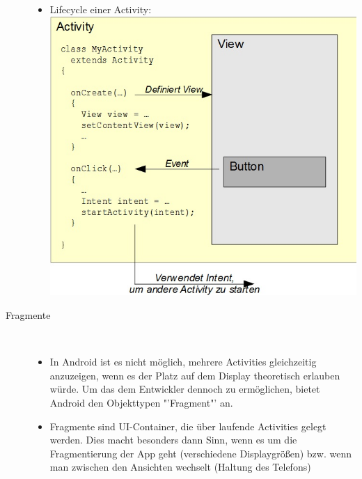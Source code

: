 \begin{description}
\begin{itemize}
\begin{itemize}
\end{itemize} 
\item Lifecycle einer Activity:\\
\includegraphics[scale=0.5]{05_Handbuch/img/Beginners_Workshop_Activity.jpg}
\end{itemize}

\newpage
 
\item[Fragmente]~\par
\begin{itemize}
\item In Android ist es nicht möglich, mehrere Activities gleichzeitig anzuzeigen, wenn es der Platz auf dem Display theoretisch erlauben würde. Um das dem Entwickler dennoch zu ermöglichen, bietet Android den Objekttypen "'Fragment"' an. 
\item Fragmente sind UI-Container, die über laufende Activities gelegt werden. Dies macht besonders dann Sinn, wenn es um die Fragmentierung der App geht (verschiedene Displaygrößen) bzw. wenn man zwischen den Ansichten wechselt (Haltung des Telefons)


\end{itemize}
\end{description}
